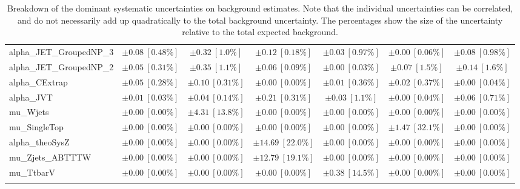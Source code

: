 \begin{sidewaystable}
\begin{center}
\begin{tabular*}{\textwidth}{@{\extracolsep{\fill}}lcccccc}
alpha\_JET\_GroupedNP\_3         & $\pm 0.08\ [0.48\%] $          & $\pm 0.32\ [1.0\%] $          & $\pm 0.12\ [0.18\%] $          & $\pm 0.03\ [0.97\%] $          & $\pm 0.00\ [0.06\%] $          & $\pm 0.08\ [0.98\%] $       \\
alpha\_JET\_GroupedNP\_2         & $\pm 0.05\ [0.31\%] $          & $\pm 0.35\ [1.1\%] $          & $\pm 0.06\ [0.09\%] $          & $\pm 0.00\ [0.03\%] $          & $\pm 0.07\ [1.5\%] $          & $\pm 0.14\ [1.6\%] $       \\
alpha\_CExtrap         & $\pm 0.05\ [0.28\%] $          & $\pm 0.10\ [0.31\%] $          & $\pm 0.00\ [0.00\%] $          & $\pm 0.01\ [0.36\%] $          & $\pm 0.02\ [0.37\%] $          & $\pm 0.00\ [0.04\%] $       \\
alpha\_JVT         & $\pm 0.01\ [0.03\%] $          & $\pm 0.04\ [0.14\%] $          & $\pm 0.21\ [0.31\%] $          & $\pm 0.03\ [1.1\%] $          & $\pm 0.00\ [0.04\%] $          & $\pm 0.06\ [0.71\%] $       \\
mu\_Wjets         & $\pm 0.00\ [0.00\%] $          & $\pm 4.31\ [13.8\%] $          & $\pm 0.00\ [0.00\%] $          & $\pm 0.00\ [0.00\%] $          & $\pm 0.00\ [0.00\%] $          & $\pm 0.00\ [0.00\%] $       \\
mu\_SingleTop         & $\pm 0.00\ [0.00\%] $          & $\pm 0.00\ [0.00\%] $          & $\pm 0.00\ [0.00\%] $          & $\pm 0.00\ [0.00\%] $          & $\pm 1.47\ [32.1\%] $          & $\pm 0.00\ [0.00\%] $       \\
alpha\_theoSysZ         & $\pm 0.00\ [0.00\%] $          & $\pm 0.00\ [0.00\%] $          & $\pm 14.69\ [22.0\%] $          & $\pm 0.00\ [0.00\%] $          & $\pm 0.00\ [0.00\%] $          & $\pm 0.00\ [0.00\%] $       \\
mu\_Zjets\_ABTTTW         & $\pm 0.00\ [0.00\%] $          & $\pm 0.00\ [0.00\%] $          & $\pm 12.79\ [19.1\%] $          & $\pm 0.00\ [0.00\%] $          & $\pm 0.00\ [0.00\%] $          & $\pm 0.00\ [0.00\%] $       \\
mu\_TtbarV         & $\pm 0.00\ [0.00\%] $          & $\pm 0.00\ [0.00\%] $          & $\pm 0.00\ [0.00\%] $          & $\pm 0.38\ [14.5\%] $          & $\pm 0.00\ [0.00\%] $          & $\pm 0.00\ [0.00\%] $       \\
\noalign{\smallskip}\hline\noalign{\smallskip}
\end{tabular*}
\end{center}
\caption[Breakdown of uncertainty on background estimates]{
Breakdown of the dominant systematic uncertainties on background estimates.
Note that the individual uncertainties can be correlated, and do not necessarily add up quadratically to 
the total background uncertainty. The percentages show the size of the uncertainty relative to the total expected background.
\label{table.results.bkgestimate.uncertainties.VRZAB_bybkg}}
\end{sidewaystable}
%
